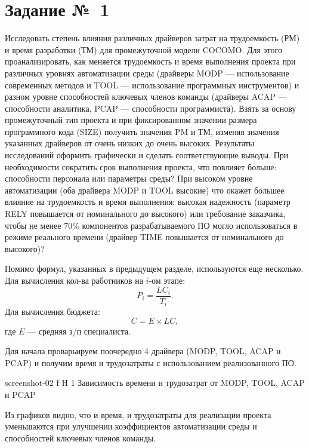 \documentclass{bmstu}
\begin{document}
\section{Задание №~1}

Исследовать степень влияния различных драйверов затрат на трудоемкость (РМ) и время разработки (ТМ) для промежуточной модели COCOMO. 
Для этого проанализировать, как меняется трудоемкость и время выполнения проекта при различных уровнях автоматизации среды (драйверы MODP --- использование современных методов и TOOL --- использование программных инструментов) и разном уровне способностей ключевых членов команды (драйверы ACAP --- способности аналитика, PCAP --- способности программиста). 
Взять за основу промежуточный тип проекта и при фиксированном значении размера программного кода (SIZE) получить значения PM и ТМ, изменяя значения указанных драйверов от очень низких до очень высоких. 
Результаты исследований оформить графически и сделать соответствующие выводы. 
При необходимости сократить срок выполнения проекта, что повлияет больше: способности персонала или параметры среды? 
При высоком уровне автоматизации (оба драйвера MODP и TOOL высокие) что окажет большее влияние на трудоемкость и время выполнения: высокая надежность (параметр RELY повышается от номинального до высокого) или требование заказчика, чтобы не менее 70\% компонентов разрабатываемого ПО могло использоваться в режиме реального времени (драйвер TIME повышается от номинального до высокого)?

Помимо формул, указанных в предыдущем разделе, используются еще несколько. 
Для вычисления кол-ва работников на $i$-ом этапе:
\begin{equation}
P_i = \frac{LC_i}{T_i}.
\end{equation}
Для вычисления бюджета:
\begin{equation}
C = E \times LC,
\end{equation}
где $E$ --- средняя з/п специалиста.

Для начала проварьируем поочередно 4 драйвера (MODP, TOOL, ACAP и PCAP) и получим время и трудозатраты с использованием реализованного ПО.

    {screenshot-02}
    {f}
    {H}
    {1\textwidth}
    {Зависимость времени и трудозатрат от MODP, TOOL, ACAP и PCAP}
    
Из графиков видно, что и время, и трудозатраты для реализации проекта уменьшаются при улучшении коэффициентов автоматизации среды и способностей ключевых членов команды.
\end{document}
